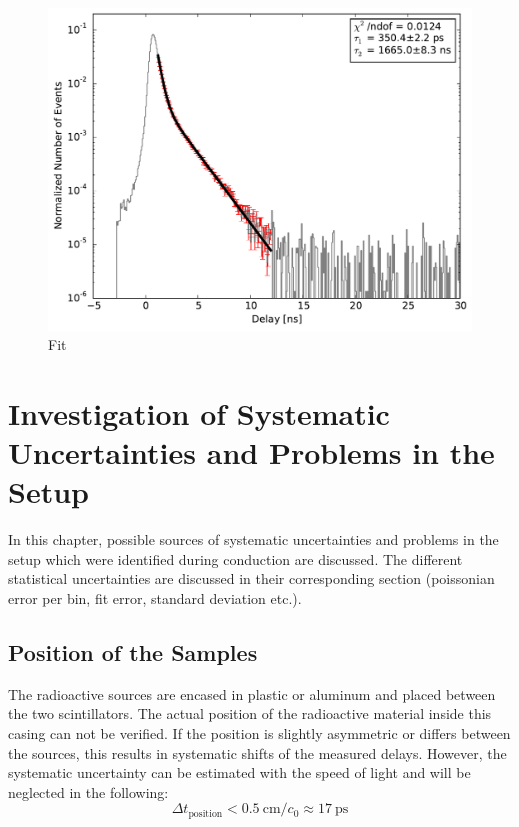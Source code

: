 \documentclass[
	paper=A4,
	parskip=full,
	chapterprefix=true,
	11pt,
	headings=normal,
	bibliography=totoc,
	listof=totoc,
	titlepage=on,
]{scrreprt}
\begin{document}
\begin{figure}
	\centering
	\includegraphics{na22_aluminum_fit}
	\caption{Fit}
\end{figure}

\chapter{Investigation of Systematic Uncertainties and Problems in the Setup}

In this chapter, possible sources of systematic uncertainties and problems in the setup which were identified during conduction are discussed. The different statistical uncertainties are discussed in their corresponding section (poissonian error per bin, fit error, standard deviation etc.).

\section{Position of the Samples}
The radioactive sources are encased in plastic or aluminum and placed between the two scintillators. The actual position of the radioactive material inside this casing can not be verified. If the position is slightly asymmetric or differs between the sources, this results in systematic shifts of the measured delays. However, the systematic uncertainty can be estimated with the speed of light and will be neglected in the following:
\begin{equation}
\Delta t_\textrm{position} < \SI{0.5}{\centi\meter} / c_0 \approx \SI{17}{\pico\second}   
\end{equation}
\end{document}
